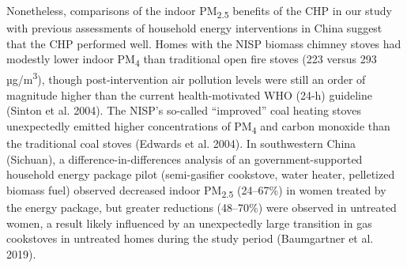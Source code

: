 \documentclass[
  letterpaper,
  DIV=11,
  numbers=noendperiod]{scrartcl}
\begin{document}
Nonetheless, comparisons of the indoor PM\textsubscript{2.5} benefits of
the CHP in our study with previous assessments of household energy
interventions in China suggest that the CHP performed well. Homes with
the NISP biomass chimney stoves had modestly lower indoor
PM\textsubscript{4} than traditional open fire stoves (223 versus 293
µg/m\textsuperscript{3}), though post-intervention air pollution levels
were still an order of magnitude higher than the current
health-motivated WHO (24-h) guideline (Sinton et al. 2004). The NISP's
so-called ``improved'' coal heating stoves unexpectedly emitted higher
concentrations of PM\textsubscript{4} and carbon monoxide than the
traditional coal stoves (Edwards et al. 2004). In southwestern China
(Sichuan), a difference-in-differences analysis of an
government-supported household energy package pilot (semi-gasifier
cookstove, water heater, pelletized biomass fuel) observed decreased
indoor PM\textsubscript{2.5} (24--67\%) in women treated by the energy
package, but greater reductions (48--70\%) were observed in untreated
women, a result likely influenced by an unexpectedly large transition in
gas cookstoves in untreated homes during the study period (Baumgartner
et al. 2019).
\end{document}
